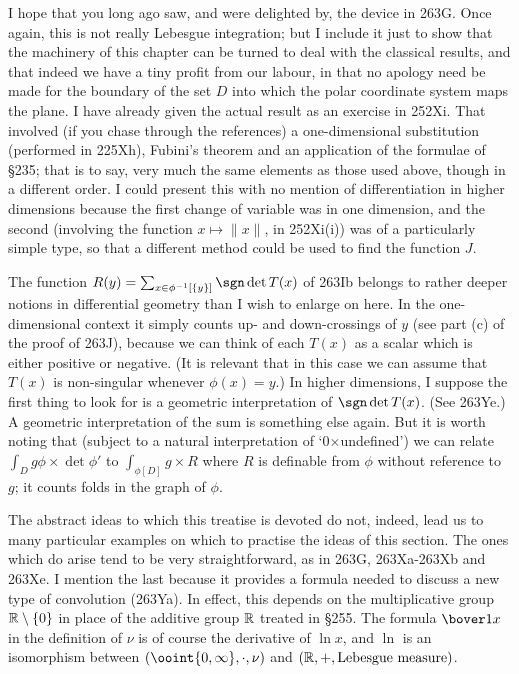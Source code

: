 {I hope that you long ago saw, and were delighted by, the device in 263G.
Once again, this is not really Lebesgue integration;  but I include it
just to show that the machinery of this chapter can be turned to deal
with the classical results, and that indeed we have a tiny profit from
our labour, in that no apology need be made for the boundary of the set
$D$ into which the polar coordinate system maps the plane.   I have
already given the actual
result as an exercise in 252Xi.   That involved (if you chase through
the references) a one-dimensional substitution (performed in 225Xh),
Fubini's theorem and an application of the formulae of \S235;  that is
to say, very much the same elements as those used above, though in a
different order.   I could present this with no mention of
differentiation in higher dimensions because the first change of
variable was in one dimension, and the second (involving the function
$x\mapsto\|x\|$, in 252Xi(i)) was of a particularly simple type, so that
a different method could be used to find the function $J$.

The function $R(y)=\sum_{x\in\phi^{-1}[\{y\}]}\sgn\det T(x)$ of 263Ib
belongs to rather deeper notions in differential geometry than I wish to
enlarge on here.   In the one-dimensional context it simply counts up- and
down-crossings of $y$ (see part (c) of the proof of 263J), because we can
think of each $T(x)$ as a scalar which is either positive or negative.
(It is relevant that in this case we can assume that $T(x)$ is non-singular
whenever $\phi(x)=y$.)   In higher dimensions, I suppose the first thing to
look for is a geometric interpretation of $\sgn\det T(x)$.   (See 263Ye.)
A geometric interpretation of the sum is something else again.
But it is worth noting that (subject to a natural interpretation of
`0$\times$undefined') we can
relate $\int_Dg\phi\times\det\phi'$ to $\int_{\phi[D]}g\times R$ where
$R$ is definable from $\phi$ without reference to $g$;  it counts folds
in the graph of $\phi$.

The abstract ideas to which this treatise is devoted do not, indeed,
lead us to many particular examples on which to practise the ideas of
this section.   The ones which do arise tend to be very straightforward,
as in 263G, 263Xa-263Xb and 263Xe.   I mention the last because it
provides a formula needed to discuss a new type of convolution (263Ya).
In effect, this depends on the multiplicative group
$\Bbb R\setminus\{0\}$ in place of the additive group $\Bbb R$ treated
in \S255.   The formula $\bover1x$ in the definition of $\nu$ is of
course the derivative of $\ln x$, and $\ln$ is an isomorphism between
$(\ooint{0,\infty},\cdot,\nu)$ and $(\Bbb R,+,\text{Lebesgue measure})$.
}%

\discrpage
